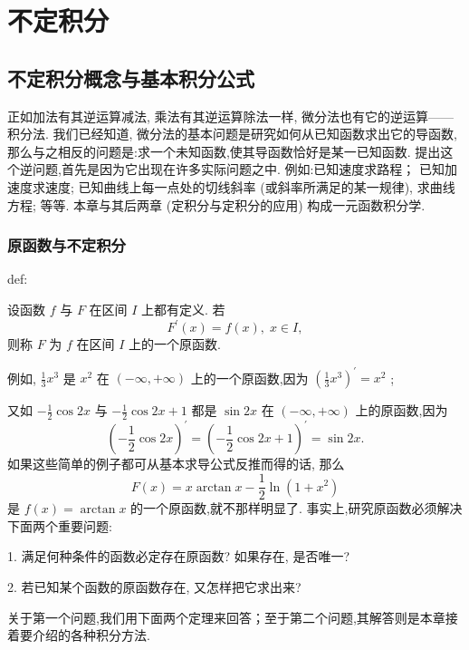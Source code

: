 \chapter{不定积分}

\section{不定积分概念与基本积分公式}

正如加法有其逆运算减法, 乘法有其逆运算除法一样, 微分法也有它的逆运算——积分法. 我们已经知道, 微分法的基本问题是研究如何从已知函数求出它的导函数,那么与之相反的问题是:求一个未知函数,使其导函数恰好是某一已知函数. 提出这个逆问题,首先是因为它出现在许多实际问题之中. 例如:已知速度求路程； 已知加速度求速度; 已知曲线上每一点处的切线斜率 (或斜率所满足的某一规律), 求曲线方程; 等等. 本章与其后两章 (定积分与定积分的应用) 构成一元函数积分学.

\subsection{原函数与不定积分}

\begin{definition}{}{def:}

\end{definition}
设函数 \(f\) 与 \(F\) 在区间 \(I\) 上都有定义. 若
\[
{F}^{\prime }\left( x\right)  = f\left( x\right) ,\;x \in  I,
\]
则称 \(F\) 为 \(f\) 在区间 \(I\) 上的一个原函数.

例如, \(\frac{1}{3}{x}^{3}\) 是 \({x}^{2}\) 在 \(\left( {-\infty , + \infty }\right)\) 上的一个原函数,因为 \({\left( \frac{1}{3}{x}^{3}\right) }^{\prime } = {x}^{2}\) ;

又如 \(- \frac{1}{2}\cos {2x}\) 与 \(- \frac{1}{2}\cos {2x} + 1\) 都是 \(\sin {2x}\) 在 \(\left( {-\infty , + \infty }\right)\) 上的原函数,因为
\[
{\left( -\frac{1}{2}\cos 2x\right) }^{\prime } = {\left( -\frac{1}{2}\cos 2x + 1\right) }^{\prime } = \sin {2x}.
\]
如果这些简单的例子都可从基本求导公式反推而得的话, 那么
\[
F\left( x\right)  = x\arctan x - \frac{1}{2}\ln \left( {1 + {x}^{2}}\right)
\]
是 \(f\left( x\right)  = \arctan x\) 的一个原函数,就不那样明显了. 事实上,研究原函数必须解决下面两个重要问题:

1. 满足何种条件的函数必定存在原函数? 如果存在, 是否唯一?

2. 若已知某个函数的原函数存在, 又怎样把它求出来?

关于第一个问题,我们用下面两个定理来回答；至于第二个问题,其解答则是本章接着要介绍的各种积分方法.

